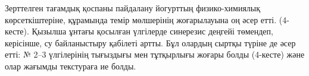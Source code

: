 % 
% 

Зерттелген тағамдық қоспаны пайдалану йогурттың физико-химиялық
көрсеткіштеріне, құрамында темір мөлшерінің жоғарылауына оң әсер етті.
(4-кесте). Қызылша ұнтағы қосылған үлгілерде синерезис деңгейі төмендеп,
керісінше, су байланыстыру қабілеті артты. Бұл олардың сыртқы түріне де
әсер етті: № 2--3 үлгілерінің тығыздығы мен тұтқырлығы жоғары болды
(4-кесте) және олар жағымды текстураға ие болды.

